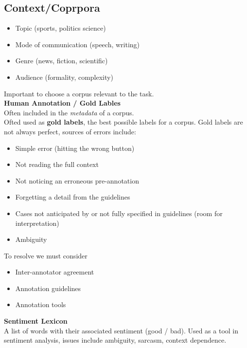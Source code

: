 \documentclass[8pt]{extarticle} %
\begin{document}
\begin{multicols*}{3}
\subsection*{Context/Coprpora}
\begin{itemize}[label=\textbullet, labelsep=0.3em, leftmargin=0.5em, itemsep=0em]
    \item Topic (sports, politics science)
    \item Mode of communication (speech, writing)
    \item Genre (news, fiction, scientific)
    \item Audience (formality, complexity)
\end{itemize}
Important to choose a corpus relevant to the task.\\

\textbf{Human Annotation / Gold Lables}\\
Often included in the \textit{metadata} of a corpus.\\
Ofted used as \textbf{gold labels}, the best possible labels for a corpus. Gold labels are not always perfect, sources of errors include:
\begin{itemize}[label=-, labelsep=0.3em, leftmargin=0.5em, itemsep=0em]
\item Simple error (hitting the wrong button) 
\item Not reading the full context 
\item Not noticing an erroneous pre-annotation 
\item Forgetting a detail from the guidelines 
\item Cases not anticipated by or not fully specified in guidelines (room for interpretation)
\item Ambiguity
\end{itemize}
To resolve we must consider
\begin{itemize}[label=\textbullet, labelsep=0.3em, leftmargin=0.5em, itemsep=0em]
    \item Inter-annotator agreement
    \item Annotation guidelines
    \item Annotation tools
\end{itemize}

\textbf{Sentiment Lexicon}\\
A list of words with their associated sentiment (good / bad). Used as a tool in sentiment analysis, issues include ambiguity, sarcasm, context dependence. 


\end{multicols*}
\end{document}
